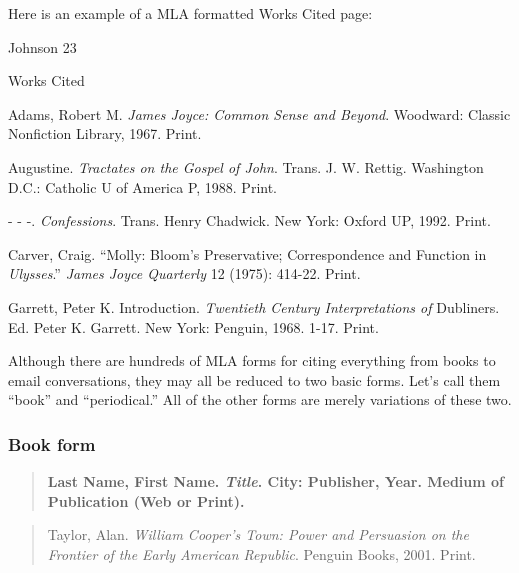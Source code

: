 Here is an example of a MLA formatted Works Cited page:

\newpage
\thispagestyle{empty}
\begin{flushright}Johnson 23\end{flushright}
\begin{center}
Works Cited
\end{center}
\begin{doublespace}

Adams, Robert M. \emph{James Joyce: Common Sense and Beyond}. Woodward: Classic \tab Nonfiction Library, 1967. Print.

Augustine. \emph{Tractates on the Gospel of John}. Trans. J. W. Rettig. Washington D.C.: \tab Catholic U 
of America P, 1988. Print.

- - -. \emph{Confessions}. Trans. Henry Chadwick. New York: Oxford UP, 1992. Print.

Carver, Craig. ``Molly: Bloom's Preservative; Correspondence and Function in \tab\emph{Ulysses}.'' \emph{James Joyce Quarterly} 12 (1975): 414-22. Print.

Garrett, Peter K. Introduction. \emph{Twentieth Century Interpretations of} Dubliners. \tab Ed. Peter K. Garrett. New York: Penguin, 1968. 1-17. Print.

\end{doublespace}

\newpage




										                



Although there are hundreds of MLA forms for citing everything from books to email conversations, they may all be reduced to two basic forms. Let's call them ``book'' and ``periodical.'' All of the other forms are merely variations of these two.

\subsubsection{Book form}


\begin{quote}
{\bf Last Name, First Name. \emph{Title}. City: Publisher, Year. Medium \tab of Publication (Web or Print).}
\end{quote}

\medskip
\medskip

\begin{quote}
Taylor, Alan. \emph{William Cooper's Town: Power and Persuasion on the \tab Frontier of the Early American Republic}. Penguin Books, 2001. \tab Print.
\end{quote}

